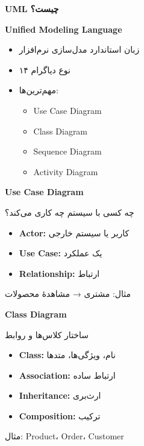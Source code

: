 \documentclass[14pt, a4paper, landscape]{extarticle}
\newcommand{\slide}[1]{%
    \newpage
    \begin{center}
    \begin{minipage}[t]{0.95\textwidth}
    \vspace{0.5cm}
    #1
    \vspace{0.5cm}
    \end{minipage}
    \end{center}
}
\newcommand{\slidetitle}[1]{%
    \begin{center}
        {\LARGE\bfseries\textcolor{primary}{#1}}
    \end{center}
    \vspace{0.5cm}
}
\newcommand{\myaccent}[1]{\textcolor{accent}{#1}}
\begin{document}
\slide{
    \slidetitle{UML چیست؟}
    \vspace{0.5cm}
    \begin{center}
        {\large\bfseries Unified Modeling Language}
    \end{center}
    \vspace{0.8cm}
    \begin{itemize}[itemsep=0.5em]
        \item زبان استاندارد مدل‌سازی نرم‌افزار
        \item ۱۴ نوع دیاگرام
        \item مهم‌ترین‌ها:
        \begin{itemize}
            \item Use Case Diagram
            \item Class Diagram
            \item Sequence Diagram
            \item Activity Diagram
        \end{itemize}
    \end{itemize}
}

\slide{
    \slidetitle{Use Case Diagram}
    \vspace{0.5cm}
    {\large چه کسی با سیستم چه کاری می‌کند؟}
    \vspace{1cm}
    \begin{itemize}[itemsep=0.5em]
        \item \textbf{Actor:} کاربر یا سیستم خارجی
        \item \textbf{Use Case:} یک عملکرد
        \item \textbf{Relationship:} ارتباط
    \end{itemize}
    \vspace{1cm}
    \begin{center}
        {\myaccent{مثال: مشتری → مشاهدهٔ محصولات}}
    \end{center}
}

\slide{
    \slidetitle{Class Diagram}
    \vspace{0.5cm}
    {\large ساختار کلاس‌ها و روابط}
    \vspace{1cm}
    \begin{itemize}[itemsep=0.5em]
        \item \textbf{Class:} نام، ویژگی‌ها، متدها
        \item \textbf{Association:} ارتباط ساده
        \item \textbf{Inheritance:} ارث‌بری
        \item \textbf{Composition:} ترکیب
    \end{itemize}
    \vspace{0.5cm}
    \begin{center}
        {\myaccent{مثال: Product، Order، Customer}}
    \end{center}
}
\end{document}
